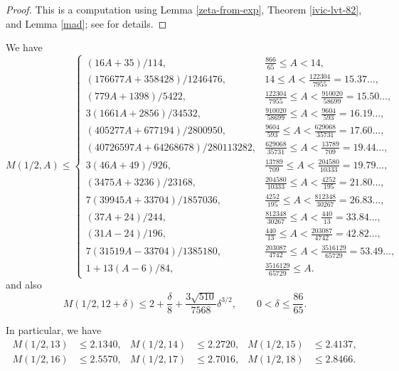 \begin{proof} This is a computation using Lemma \ref{zeta-from-exp}, Theorem \ref{ivic-lvt-82}, and Lemma \ref{mad}; see \cite{ivic} for details.
\end{proof}

\begin{theorem}\label{M_bound_larger_A}\cite[Theorems 2.1, 2.2]{trudgian-yang}
    We have
    \[
    M(1/2, A) \leq \begin{cases}
        (16A + 35)/114 ,& \frac{866}{65} \leq A < 14, \\
         (176677A + 358428)/1246476 ,& 14 \leq A < \frac{122304}{7955} = 15.37\ldots, \\
         (779A + 1398)/5422 ,& \frac{122304}{7955} \leq A < \frac{910020}{58699} = 15.50\ldots, \\
         3(1661A + 2856)/34532 ,& \frac{910020}{58699} \leq A < \frac{9604}{593} = 16.19\ldots, \\
         (405277A + 677194)/2800950 ,& \frac{9604}{593} \leq A < \frac{629068}{35731} = 17.60\ldots, \\
         (40726597A + 64268678)/280113282 ,& \frac{629068}{35731} \leq A < \frac{13789}{709} = 19.44\ldots, \\
         3(46A + 49)/926 ,& \frac{13789}{709} \leq A < \frac{204580}{10333} = 19.79\ldots,\\
         (3475A + 3236)/23168 ,& \frac{204580}{10333} \leq A < \frac{4252}{195} = 21.80\ldots, \\
         7(39945A + 33704)/1857036 ,& \frac{4252}{195} \leq A < \frac{812348}{30267} = 26.83\ldots, \\
         (37A + 24)/244 ,& \frac{812348}{30267} \leq A < \frac{440}{13} = 33.84\ldots, \\
         (31A - 24)/196 ,& \frac{440}{13} \leq A < \frac{203087}{4742} = 42.82\ldots, \\
         7(31519A - 33704)/1385180 ,& \frac{203087}{4742} \leq A < \frac{3516129}{65729} = 53.49\ldots, \\
        1 + 13(A - 6)/84 ,& \frac{3516129}{65729} \leq A.
    \end{cases}
    \]
   and also
   \[
    M(1/2, 12 + \delta) \le 2 + \frac{\delta}{8} + \frac{3\sqrt{510}}{7568}\delta^{3/2},\qquad 0 < \delta \le \frac{86}{65}.
    \]
\end{theorem}
    In particular, we have
    \begin{align*}
    M(1/2,13) &\le 2.1340,&M(1/2,14) &\le 2.2720,&M(1/2,15) &\le 2.4137,\\
    M(1/2,16) &\le 2.5570,&M(1/2,17) &\le 2.7016,&M(1/2,18) &\le 2.8466.
\end{align*}


